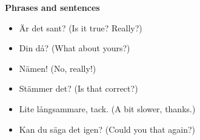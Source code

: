
\begin{flushleft}
    \textbf{Phrases and sentences}
    \begin{itemize}
        \item Är det sant? (Is it true? Really?)
        \item Din då? (What about yours?)
        \item Nämen! (No, really!)
        \item Stämmer det? (Is that correct?)
        \item Lite långsammare, tack. (A bit slower, thanks.)
        \item Kan du säga det igen? (Could you that again?)
    \end{itemize}
\end{flushleft}

